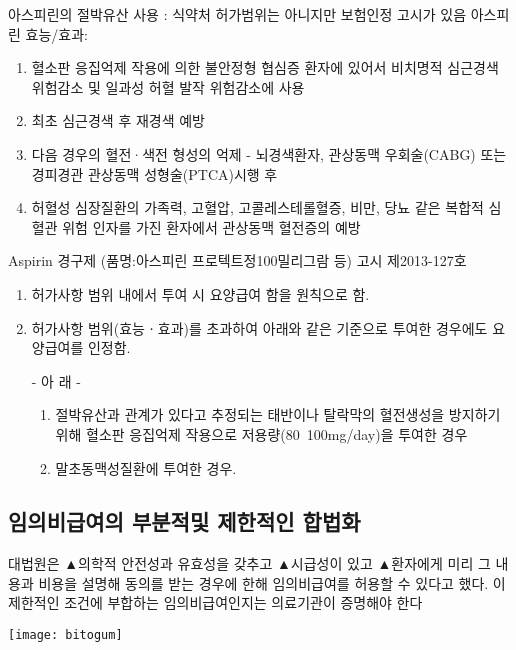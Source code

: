 \begin{commentbox}{아스피린의 절박유산 사용 : 식약처 허가범위는 아니지만 보험인정 고시가 있음} 
아스피린 효능/효과:
\begin{enumerate}[1.]\tightlist
\item 혈소판 응집억제 작용에 의한 불안정형 협심증 환자에 있어서 비치명적 심근경색 위험감소 및 일과성 허혈 발작 위험감소에 사용 
\item 최초 심근경색 후 재경색 예방 
\item 다음 경우의 혈전·색전 형성의 억제 - 뇌경색환자, 관상동맥 우회술(CABG) 또는 경피경관 관상동맥 성형술(PTCA)시행 후 
\item 허혈성 심장질환의 가족력, 고혈압, 고콜레스테롤혈증, 비만, 당뇨 같은 복합적 심혈관 위험 인자를 가진 환자에서 관상동맥 혈전증의 예방
\end{enumerate}

Aspirin 경구제 (품명:아스피린 프로텍트정100밀리그람 등) 고시 제2013-127호
\begin{enumerate}[1.]\tightlist
\item 허가사항 범위 내에서 투여 시 요양급여 함을 원칙으로 함. 
\item 허가사항 범위(효능ㆍ효과)를 초과하여 아래와 같은 기준으로 투여한 경우에도 요양급여를 인정함. \par
- 아 래 -
	\begin{enumerate}[가.]\tightlist
	\item 절박유산과 관계가 있다고 추정되는 태반이나 탈락막의 혈전생성을 방지하기 위해 혈소판 응집억제 작용으로 저용량(80~100mg/day)을 투여한 경우 
	\item 말초동맥성질환에 투여한 경우.
	\end{enumerate}
\end{enumerate}
\end{commentbox}
\subsection{임의비급여의 부분적및 제한적인 합법화}
대법원은 ▲의학적 안전성과 유효성을 갖추고 ▲시급성이 있고 ▲환자에게 미리 그 내용과 비용을 설명해 동의를 받는 경우에 한해 임의비급여를 허용할 수 있다고 했다. 이 제한적인 조건에 부합하는 임의비급여인지는 의료기관이 증명해야 한다\par
\medskip
\texttt{[image: bitogum]}

